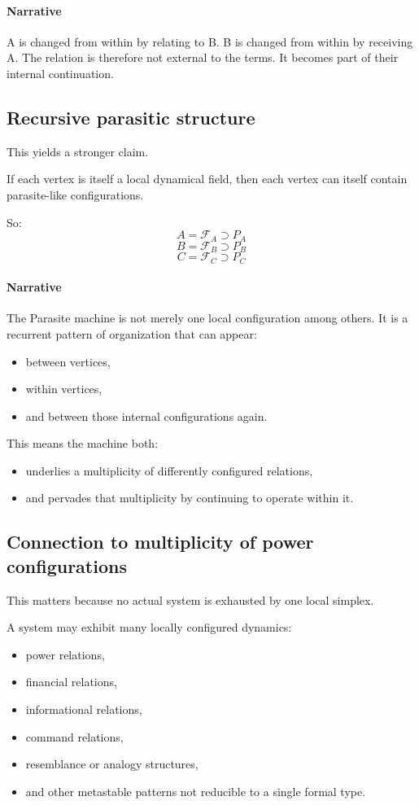 \documentclass[11pt]{article}
\begin{document}
\paragraph{Narrative}
A is changed from within by relating to B.
B is changed from within by receiving A.
The relation is therefore not external to the terms.
It becomes part of their internal continuation.

\subsection*{Recursive parasitic structure}

This yields a stronger claim.

If each vertex is itself a local dynamical field, then each vertex can itself
contain parasite-like configurations.

So:
\[
A = \mathcal{F}_A \supset P_A
\]
\[
B = \mathcal{F}_B \supset P_B
\]
\[
C = \mathcal{F}_C \supset P_C
\]

\paragraph{Narrative}
The Parasite machine is not merely one local configuration among others.
It is a recurrent pattern of organization that can appear:
\begin{itemize}
\item between vertices,
\item within vertices,
\item and between those internal configurations again.
\end{itemize}

This means the machine both:
\begin{itemize}
\item underlies a multiplicity of differently configured relations,
\item and pervades that multiplicity by continuing to operate within it.
\end{itemize}

\subsection*{Connection to multiplicity of power configurations}

This matters because no actual system is exhausted by one local simplex.

A system may exhibit many locally configured dynamics:
\begin{itemize}
\item power relations,
\item financial relations,
\item informational relations,
\item command relations,
\item resemblance or analogy structures,
\item and other metastable patterns not reducible to a single formal type.
\end{itemize}
\end{document}
